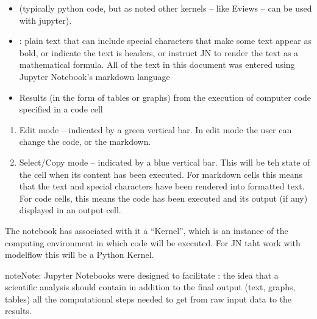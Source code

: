 \documentclass[letterpaper,10pt,english]{jupyterBook}
\begin{document}
\sphinxAtStartPar
{}
\begin{itemize}
\item {} 
\sphinxAtStartPar
{} (typically python code, but as noted other kernels – like Eviews – can be used with jupyter).

\item {} 
\sphinxAtStartPar
{}: plain text that can include special characters that make some text appear as bold, or indicate the text is headers, or instruct JN to render the text as a mathematical formula.  All of the text in this document was entered using Jupyter Notebook’s markdown language

\item {} 
\sphinxAtStartPar
Results (in the form of tables or graphs) from the execution of computer code specified in a code cell

\end{itemize}

\sphinxAtStartPar
{}
\begin{enumerate}
%
\item {} 
\sphinxAtStartPar
Edit mode – indicated by a green vertical bar. In edit mode the user can change the code, or the markdown.

\item {} 
\sphinxAtStartPar
Select/Copy mode – indicated by a blue vertical bar.  This will be teh state of the cell when its content has been executed.  For markdown cells this means that the text and special characters have been rendered into formatted text.  For code cells, this means the code has been executed and its output (if any) displayed in an output cell.

\end{enumerate}

\sphinxAtStartPar
The notebook has associated with it a “Kernel”, which is an instance of the computing environment in which code will be executed. For JN taht work with modelflow this will be a Python Kernel.

\begin{sphinxadmonition}{note}{Note:}
\sphinxAtStartPar
Jupyter Notebooks were designed to facilitate : the idea that a scientific analysis should contain \sphinxhyphen{} in addition to the final output (text, graphs, tables) \sphinxhyphen{} all the computational steps needed to get from raw input data to the results.
\end{sphinxadmonition}
\end{document}
